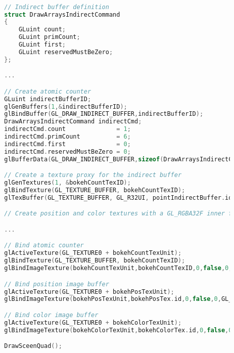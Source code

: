 \begin{lstlisting}[language=C++,float={htb},caption={Initialization and drawing for extracting bokehs.},label={YourName:bokehextraction}]

		// Indirect buffer definition
		struct DrawArraysIndirectCommand
		{
			GLuint count;
			GLuint primCount;
			GLuint first;
			GLuint reservedMustBeZero;
		};

		...

		// Create atomic counter
		GLuint indirectBufferID;
		glGenBuffers(1,&indirectBufferID);
		glBindBuffer(GL_DRAW_INDIRECT_BUFFER,indirectBufferID);
		DrawArraysIndirectCommand indirectCmd;
		indirectCmd.count              = 1;
		indirectCmd.primCount          = 6;
		indirectCmd.first              = 0;
		indirectCmd.reservedMustBeZero = 0;
		glBufferData(GL_DRAW_INDIRECT_BUFFER,sizeof(DrawArraysIndirectCommand),&indirecCmd,GL_DYNAMIC_DRAW);

		// Create a texture proxy for the indirect buffer
		glGenTextures(1, &bokehCountTexID);
		glBindTexture(GL_TEXTURE_BUFFER, bokehCountTexID);
		glTexBuffer(GL_TEXTURE_BUFFER, GL_R32UI, pointIndirectBuffer.id);

		// Create position and color textures with a GL_RGBA32F inner format

		...

		// Bind atomic counter
		glActiveTexture(GL_TEXTURE0 + bokehCountTexUnit);
		glBindTexture(GL_TEXTURE_BUFFER, bokehCountTexID);
		glBindImageTexture(bokehCountTexUnit,bokehCountTexID,0,false,0,GL_READ_WRITE,GL_R32UI);

		// Bind position image buffer
		glActiveTexture(GL_TEXTURE0 + bokehPosTexUnit);
		glBindImageTexture(bokehPosTexUnit,bokehPosTex.id,0,false,0,GL_READ_WRITE,GL_RGBA32F);

		// Bind color image buffer
		glActiveTexture(GL_TEXTURE0 + bokehColorTexUnit);
		glBindImageTexture(bokehColorTexUnit,bokehColorTex.id,0,false,0,GL_READ_WRITE,GL_RGBA32F);

		DrawSceenQuad();
\end{lstlisting}



